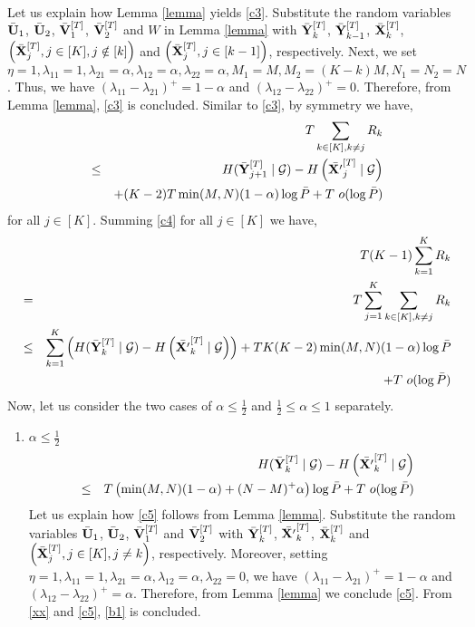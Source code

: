 \documentclass[11pt]{article}
\begin{document}
\begin{enumerate}
\begin{eqnarray}
\end{eqnarray}
Let us explain how Lemma \ref{lemma} {yields}  \eqref{c3}. Substitute the random variables $\bar{\bf U}_1$, $\bar{\bf U}_2$, $\bar{\bf V}_1^{[T]}$, $\bar{\bf V}_2^{[T]}$ and $W$  in Lemma \ref{lemma}  with $\bar{\bf Y}^{[T]}_{k}$, $\bar{\bf Y}^{[T]}_{k-1}$, $\bar{\bf X}_k^{[T]}$,  $\left(\bar{\bf X}_{j}^{[T]},j\in[K],j\notin[k]\right)$ and $\left(\bar{\bf X}_{j}^{[T]},j\in[k-1]\right)$, respectively. Next,  we set $\eta=1, \lambda_{11}=1, \lambda_{21}=\alpha, \lambda_{12}=\alpha, \lambda_{22}=\alpha,M_1=M,M_2=(K-k)M,N_1=N_2=N$. Thus, we have $(\lambda_{11}-\lambda_{21})^+=1-\alpha$ and $(\lambda_{12}-\lambda_{22})^+=0$. Therefore, from Lemma \ref{lemma},  \eqref{c3} is concluded. Similar to  \eqref{c3}, by symmetry we have, 
\begin{eqnarray}
&&T\sum_{k\in[K],k\neq j}R_k\nonumber\\
&\le& H(\bar{\bf Y}^{[T]}_{j+1}\mid \mathcal{G})-H\left(\bar{\bf X'}^{[T]}_{j}\mid \mathcal{G}\right)\nonumber\\
&&+(K-2) T\min(M,N)(1-\alpha)\log{\bar{P}}+T~o(\log{\bar{P}})\label{c4}
\end{eqnarray}
for all $j\in[K]$. Summing \eqref{c4} for all $j\in[K]$ we have,
\begin{eqnarray}
&&T(K-1)\sum_{k=1}^KR_k\nonumber\\
&=&T\sum_{j=1}^K\sum_{k\in[K],k\neq j}R_k\nonumber\\
&\le& \sum_{k=1}^K\left(H(\bar{\bf Y}^{[T]}_{k}\mid \mathcal{G})-H\left(\bar{\bf X'}^{[T]}_{k}\mid \mathcal{G}\right)\right)+TK(K-2) \min(M,N)(1-\alpha)\log{\bar{P}}\nonumber\\
&&+T~o(\log{\bar{P}})\label{xx}
\end{eqnarray}
Now, let us consider the two cases of $\alpha\le\frac{1}{2}$ and $\frac{1}{2}\le\alpha\le1$ separately.
\begin{enumerate}
\item{$\alpha\le\frac{1}{2}$}
\begin{eqnarray}
&&H(\bar{\bf Y}^{[T]}_{k}\mid \mathcal{G})-H\left(\bar{\bf X'}^{[T]}_{k}\mid \mathcal{G}\right)\nonumber\\
&\le&  T\left(\min(M,N)(1-\alpha)+(N-M)^+\alpha\right)\log{\bar{P}}+T~o(\log{\bar{P}})\label{c5}
\end{eqnarray}
Let us explain how \eqref{c5} follows from Lemma \ref{lemma}. Substitute the random variables  $\bar{\bf U}_1$, $\bar{\bf U}_2$, $\bar{\bf V}_1^{[T]}$ and $\bar{\bf V}_2^{[T]}$  with $\bar{\bf Y}^{[T]}_{k}$, $\bar{\bf X'}^{[T]}_{k}$, $\bar{\bf X}_k^{[T]}$ and $\left(\bar{\bf X}_{j}^{[T]},j\in[K],j\neq k\right)$, respectively. Moreover,  setting $\eta=1, \lambda_{11}=1, \lambda_{21}=\alpha, \lambda_{12}=\alpha, \lambda_{22}=0$, we have $(\lambda_{11}-\lambda_{21})^+=1-\alpha$ and $(\lambda_{12}-\lambda_{22})^+=\alpha$. Therefore, from Lemma \ref{lemma} we conclude \eqref{c5}. From \eqref{xx} and \eqref{c5}, \eqref{b1} is concluded.

\end{enumerate}
\end{enumerate}
\end{document}
